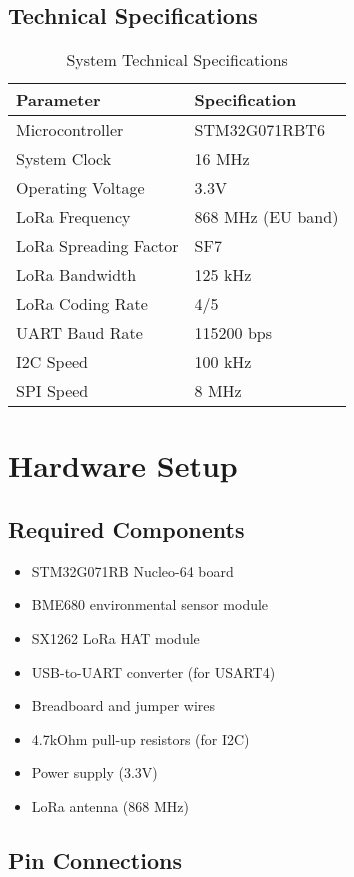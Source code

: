 \documentclass[11pt,a4paper]{article}
\begin{document}
\subsection{Technical Specifications}
\begin{table}[h]
\centering
\begin{tabular}{|l|l|}
\hline
\textbf{Parameter} & \textbf{Specification} \\
\hline
Microcontroller & STM32G071RBT6 \\
\hline
System Clock & 16 MHz \\
\hline
Operating Voltage & 3.3V \\
\hline
LoRa Frequency & 868 MHz (EU band) \\
\hline
LoRa Spreading Factor & SF7 \\
\hline
LoRa Bandwidth & 125 kHz \\
\hline
LoRa Coding Rate & 4/5 \\
\hline
UART Baud Rate & 115200 bps \\
\hline
I2C Speed & 100 kHz \\
\hline
SPI Speed & 8 MHz \\
\hline
\end{tabular}
\caption{System Technical Specifications}
\end{table}

\section{Hardware Setup}

\subsection{Required Components}
\begin{itemize}
    \item STM32G071RB Nucleo-64 board
    \item BME680 environmental sensor module
    \item SX1262 LoRa HAT module
    \item USB-to-UART converter (for USART4)
    \item Breadboard and jumper wires
    \item 4.7kOhm pull-up resistors (for I2C)
    \item Power supply (3.3V)
    \item LoRa antenna (868 MHz)
\end{itemize}

\subsection{Pin Connections}
\end{document}
